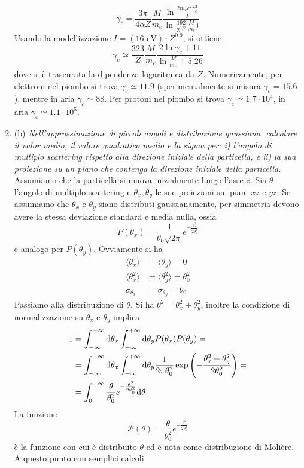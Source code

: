 \documentclass{article}
\renewcommand{\b}{(b)}
\renewcommand{\t}[1]{\textit{ #1}}
\begin{document}
\begin{enumerate}
	\[\gamma_c=\frac{3\pi}{4\alpha Z}\frac{M}{m_e}\frac{\ln\frac{2m_ec^2\gamma_c^2}{I}}{\ln\frac{192}{Z^{1/3}}\frac{M}{m_e})}\]
	Usando la modellizzazione $I=(16\textrm{ eV})\cdot Z^{0.9}$, si ottiene
	\[\gamma_c\simeq\frac{323}{Z}\frac{M}{m_e}\frac{2\ln\gamma_c+11}{\ln\frac{M}{m_e}+5.26}\]
	dove si è trascurata la dipendenza logaritmica da $Z$. Numericamente, per elettroni nel piombo si trova $\gamma_c\simeq 11.9$ (sperimentalmente si misura $\gamma_c=15.6$), mentre in aria $\gamma_c\simeq88$. Per protoni nel piombo si trova $\gamma_c\simeq1.7\cdot10^4$, in aria $\gamma_c\simeq1.1\cdot10^5$.
	\item\b\t{Nell'approssimazione di piccoli angoli e distribuzione gaussiana, calcolare il valor
		medio, il valore quadratico medio e la sigma per: i) l'angolo di multiplo scattering
		rispetto alla direzione iniziale della particella, e ii) la sua proiezione su un piano
		che contenga la direzione iniziale della particella.}
		Assumiamo che la particella si muova inizialmente lungo l'asse $\hat{z}$. Sia $\theta$ l'angolo di multiplo scattering e $\theta_x,\theta_y$ le sue proiezioni sui piani $xz$ e $yz$. Se assumiamo che $\theta_x$ e $\theta_y$ siano distributi gaussianamente, per simmetria devono avere la stessa deviazione standard e media nulla, ossia
		\[P(\theta_x)=\frac{1}{\theta_0\sqrt{2\pi}}e^{-\frac{\theta_x^2}{2\theta_0^2}}\]
		e analogo per $P(\theta_y)$. Ovviamente si ha
		\begin{align*}
			\langle\theta_x\rangle&=\langle\theta_y\rangle=0\\\langle\theta_x^2\rangle&=\langle\theta_y^2\rangle=\theta_0^2\\\sigma_{\theta_x}&=\sigma_{\theta_y}=\theta_0
		\end{align*}
		Passiamo alla distribuzione di $\theta$. Si ha $\theta^2=\theta_x^2+\theta_y^2$, inoltre la condizione di normalizzazione su $\theta_x$ e $\theta_y$ implica
		\begin{align*}
			1&=\int_{-\infty}^{+\infty}\mathrm{d} \theta_x\int_{-\infty}^{+\infty}\mathrm{d} \theta_yP(\theta_x)P(\theta_y)=\\&=
			\int_{-\infty}^{+\infty}\mathrm{d} \theta_x\int_{-\infty}^{+\infty}\mathrm{d} \theta_y\frac{1}{2\pi\theta_0^2}\exp\left(-\frac{\theta_x^2+\theta_y^2}{2\theta_0^2}\right)=\\&=\int_{0}^{+\infty}\frac{\theta}{\theta_0^2}e^{-\frac{\theta^2}{2\theta_0^2}}\mathrm{d} \theta
		\end{align*}
		La funzione
		\[\mathcal{P}(\theta)=\frac{\theta}{\theta_0^2}e^{-\frac{\theta^2}{2\theta_0^2}}\]
		è la funzione con cui è distribuito $\theta$ ed è nota come distribuzione di Molière. A questo punto con semplici calcoli

\end{enumerate}
\end{document}
